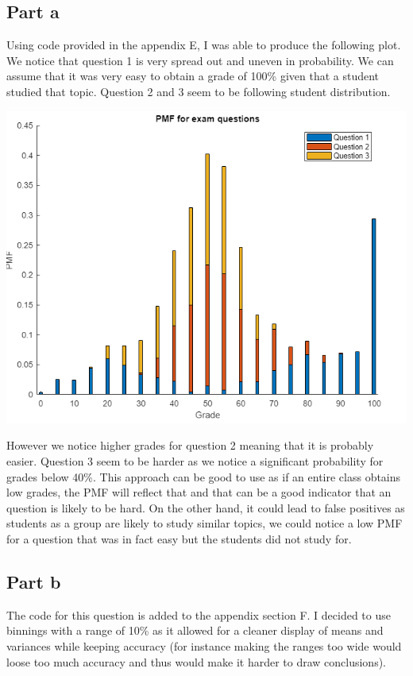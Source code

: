 \documentclass[10pt]{article}
\begin{document}
\subsection*{Part a}
Using code provided in the appendix E, I was able to produce the following
plot.  
We notice that question 1 is very spread out and uneven in probability. We can
assume that it was very easy to obtain a grade of 100\% given that a student studied that topic.
Question 2 and 3 seem to be following student distribution.
\begin{center}
    \includegraphics[scale=0.385]{final_pmf}
\end{center}
However we notice higher grades for question 2 meaning that it is probably easier.
Question 3 seem to be harder as we notice a significant probability for grades below 40\%.
This approach can be good to use as if an entire class obtains low grades, the PMF will reflect that and 
that can be a good indicator that an question is likely to be hard.
On the other hand, it could lead to false positives as students as a group are likely to study
similar topics, we could notice a low PMF for a question that was in fact easy but the students did not
study for.

\subsection*{Part b}
The code for this question is added to the appendix section F. I decided to use binnings
with a range of 10\% as it allowed for a cleaner display of means and variances while keeping 
accuracy (for instance making the ranges too wide would loose too much accuracy and thus would 
make it harder to draw conclusions).
\end{document}
